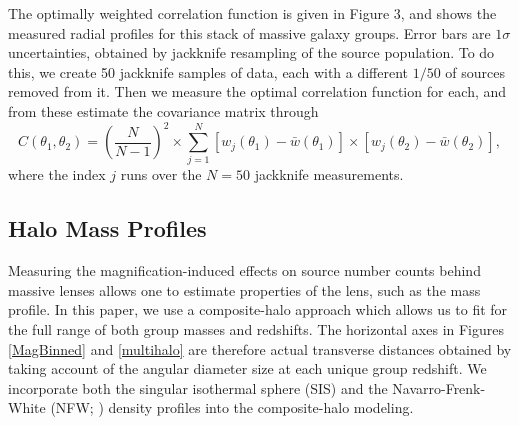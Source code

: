 \documentclass[iop]{emulateapj}
\begin{document}
The optimally weighted correlation function is given in Figure 3, and shows the measured radial profiles for this stack of massive galaxy groups. Error bars are $1 \sigma$ uncertainties, obtained by jackknife resampling of the source population. To do this, we create 50 jackknife samples of data, each with a different $1/50$ of sources removed from it. Then we measure the optimal correlation function for each, and from these estimate the covariance matrix through
\begin{equation}
C(\theta_1, \theta_2)= \left( \frac{N}{N-1} \right)^2 \times \sum_{j=1}^N [w_j(\theta_1)-\bar{w}(\theta_1)] \times [w_j(\theta_2)-\bar{w}(\theta_2)],
\end{equation}
where the index $j$ runs over the $N=50$ jackknife measurements.

\subsection{Halo Mass Profiles}
Measuring the magnification-induced effects on source number counts behind massive lenses allows one to estimate properties of the lens, such as the mass profile. In this paper, we use a composite-halo approach which allows us to fit for the full range of both group masses and redshifts. The horizontal axes in Figures \ref{MagBinned} and \ref{multihalo} are therefore actual transverse distances obtained by taking account of the angular diameter size at each unique group redshift. We incorporate both the singular isothermal sphere (SIS) and the Navarro-Frenk-White (NFW; \citep{nfw97}) density profiles into the composite-halo modeling.


\end{document}
